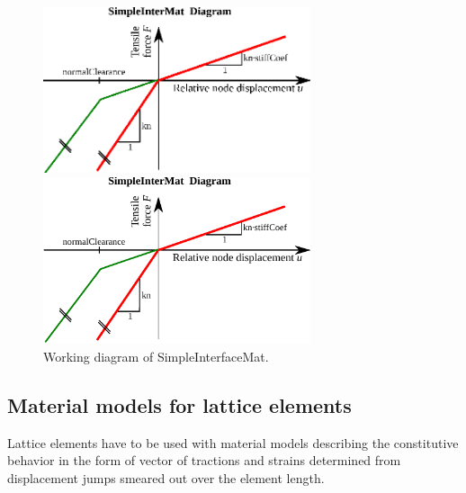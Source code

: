 \documentclass[a4paper]{article}
\begin{document}
\begin{figure}[!htb]
\begin{htmlonly}
  \centerline{\includegraphics[width=0.7\textwidth]{Simple_interface_material_diag.eps}}
\end{htmlonly}
 \centerline{\includegraphics[width=0.7\textwidth]{Simple_interface_material_diag.pdf}}
  \caption{Working diagram of SimpleInterfaceMat.}
  \label{SimpleInterfaceMat}
\end{figure}

\subsection{Material models for lattice elements}

Lattice elements have to be used with material models describing the constitutive behavior in the form of vector of  tractions and strains determined from displacement jumps smeared out over the element length.
\end{document}
